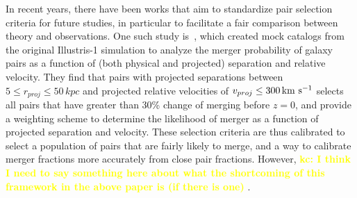\documentclass[twocolumn,linenumbers]{aastex631}
\newcommand{\kc}[1]{\textcolor{yellow}{\textbf{kc: #1}} }
\begin{document}
            In recent years, there have been works that aim to standardize pair selection criteria for future studies, in particular to facilitate a fair comparison between theory and observations. 
            One such study is~\citet{Ventou2019}, which created mock catalogs from the original Illustris-1 simulation to analyze the merger probability of galaxy pairs as a function of (both physical and projected) separation and relative velocity. 
            They find that pairs with projected separations between $5\leq r_{proj} \leq 50\,kpc$ and projected relative velocities of $v_{proj}\leq300\,\mathrm{km}~\mathrm{s}^{-1}$ selects all pairs that have greater than 30\% change of merging before $z=0$, and provide a weighting scheme to determine the likelihood of merger as a function of projected separation and velocity.  
            These selection criteria are thus calibrated to select a population of pairs that are fairly likely to merge, and a way to calibrate merger fractions more accurately from close pair fractions.
            However, \kc{I think I need to say something here about what the shortcoming of this framework in the above paper is (if there is one) }.

           
\end{document}
